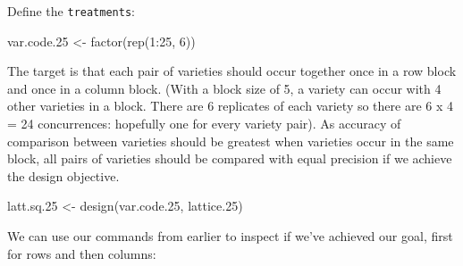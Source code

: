 \documentclass[
]{book}
\newenvironment{Shaded}{\begin{snugshade}}{\end{snugshade}}
\newcommand{\DecValTok}[1]{\textcolor[rgb]{0.00,0.00,0.81}{#1}}
\newcommand{\FloatTok}[1]{\textcolor[rgb]{0.00,0.00,0.81}{#1}}
\newcommand{\FunctionTok}[1]{\textcolor[rgb]{0.00,0.00,0.00}{#1}}
\newcommand{\NormalTok}[1]{#1}
\newcommand{\OtherTok}[1]{\textcolor[rgb]{0.56,0.35,0.01}{#1}}
\newcommand{\SpecialCharTok}[1]{\textcolor[rgb]{0.00,0.00,0.00}{#1}}
\begin{document}
Define the \texttt{treatments}:

\begin{Shaded}
\begin{Highlighting}[]
\NormalTok{var.code}\FloatTok{.25} \OtherTok{\textless{}{-}} \FunctionTok{factor}\NormalTok{(}\FunctionTok{rep}\NormalTok{(}\DecValTok{1}\SpecialCharTok{:}\DecValTok{25}\NormalTok{, }\DecValTok{6}\NormalTok{))}
\end{Highlighting}
\end{Shaded}

The target is that each pair of varieties should occur together once in a row block and once in a column block. (With a block size of 5, a variety can occur with 4 other varieties in a block. There are 6 replicates of each variety so there are 6 x 4 = 24 concurrences: hopefully one for every variety pair). As accuracy of comparison between varieties should be greatest when varieties occur in the same block, all pairs of varieties should be compared with equal precision if we achieve the design objective.

\begin{Shaded}
\begin{Highlighting}[]
\NormalTok{latt.sq}\FloatTok{.25} \OtherTok{\textless{}{-}} \FunctionTok{design}\NormalTok{(var.code}\FloatTok{.25}\NormalTok{, lattice}\FloatTok{.25}\NormalTok{)}
\end{Highlighting}
\end{Shaded}

We can use our commands from earlier to inspect if we've achieved our goal, first for rows and then columns:

\begin{Shaded}
\end{Shaded}
\end{document}
